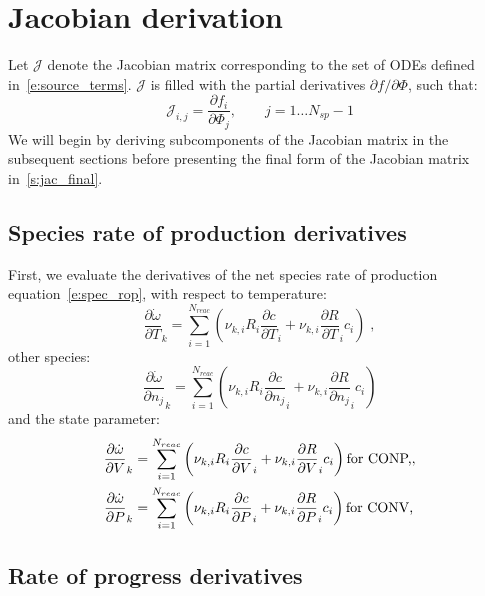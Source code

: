 \documentclass[12pt]{article}
\newcommand{\ns}{N_{sp}}
\newcommand{\nr}{N_{reac}}
\newcommand{\conp}{CONP}
\newcommand{\conv}{CONV}
\newcommand{\dconp}{\ifmmode\text{for \conp,}\else for \conp,\fi}
\newcommand{\dconv}{\ifmmode\text{for \conv,}\else for \conv,\fi}
\begin{document}
\section{Jacobian derivation}

Let $\mathcal{J}$ denote the Jacobian matrix corresponding to the set of ODEs defined in~\cref{e:source_terms}.
$\mathcal{J}$ is filled with the partial derivatives $\partial f / \partial \Phi$, such that:
\begin{equation}
 \mathcal{J}_{i,j} = \frac{\partial f_i}{\partial \Phi_j},\qquad j=1 \ldots \ns - 1
\end{equation}
We will begin by deriving subcomponents of the Jacobian matrix in the subsequent sections before presenting the final form of the Jacobian matrix in~\cref{s:jac_final}.

\subsection{Species rate of production derivatives}
First, we evaluate the derivatives of the net species rate of production equation~\cref{e:spec_rop}, with respect to temperature:
\begin{equation}
 \label{e:dwdot_dT}
 \frac{\partial \dot{\omega} }{\partial T }_{k} = \sum_{i=1}^{\nr} \left(\nu_{k,i} R_{i} \frac{\partial c }{\partial T }_{i} + \nu_{k,i} \frac{\partial R }{\partial T }_{i} c_{i}\right) \;,
\end{equation}
other species:
\begin{equation}
 \label{e:dwdot_dnj}
 \frac{\partial \dot{\omega} }{\partial {n_j} }_{k} = \sum_{i=1}^{\nr} \left(\nu_{k,i} R_{i} \frac{\partial c }{\partial {n_j} }_{i} + \nu_{k,i} \frac{\partial R }{\partial {n_j} }_{i} c_{i}\right)
\end{equation}
and the state parameter:
\begin{subequations}
 \label{e:dwdot_de}
 \begin{align}
  \frac{\partial \dot{\omega} }{\partial V }_{k} &= \sum_{i=1}^{\nr} \left(\nu_{k,i} R_{i} \frac{\partial c }{\partial V }_{i} + \nu_{k,i} \frac{\partial R }{\partial V }_{i} c_{i}\right)\dconp,\\
  \frac{\partial \dot{\omega} }{\partial P }_{k} &= \sum_{i=1}^{\nr} \left(\nu_{k,i} R_{i} \frac{\partial c }{\partial P }_{i} + \nu_{k,i} \frac{\partial R }{\partial P }_{i} c_{i}\right)\dconv
 \end{align}
\end{subequations}

\subsection{Rate of progress derivatives}
\end{document}
